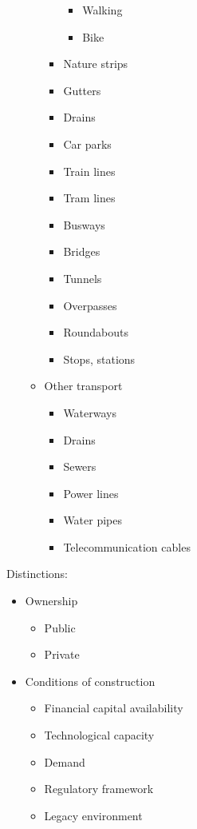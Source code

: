 \documentclass[]{article}
\begin{document}
\begin{itemize}
\begin{itemize}
\begin{itemize}
      \begin{itemize}
      \itemsep1pt\parskip0pt
      \item
        Walking
      \item
        Bike
      \end{itemize}
    \item
      Nature strips
    \item
      Gutters
    \item
      Drains
    \item
      Car parks
    \item
      Train lines
    \item
      Tram lines
    \item
      Busways
    \item
      Bridges
    \item
      Tunnels
    \item
      Overpasses
    \item
      Roundabouts
    \item
      Stops, stations
    \end{itemize}
  \item
    Other transport

    \begin{itemize}
    \itemsep1pt\parskip0pt
    \item
      Waterways
    \item
      Drains
    \item
      Sewers
    \item
      Power lines
    \item
      Water pipes
    \item
      Telecommunication cables
    \end{itemize}
  \end{itemize}
\end{itemize}

Distinctions:

\begin{itemize}
\itemsep1pt\parskip0pt
\item
  Ownership

  \begin{itemize}
  \itemsep1pt\parskip0pt
  \item
    Public
  \item
    Private
  \end{itemize}
\item
  Conditions of construction

  \begin{itemize}
  \itemsep1pt\parskip0pt
  \item
    Financial capital availability
  \item
    Technological capacity
  \item
    Demand
  \item
    Regulatory framework
  \item
    Legacy environment
  \end{itemize}
\end{itemize}
\end{document}
